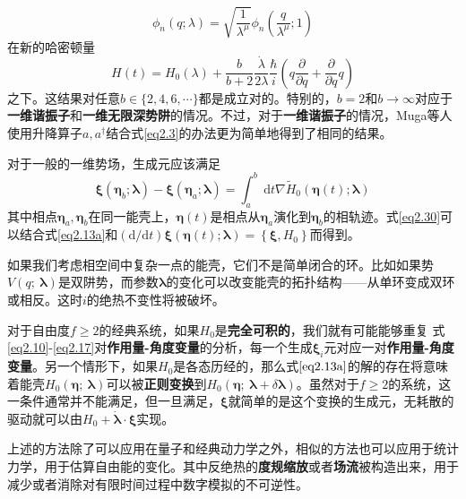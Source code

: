 \begin{equation}
    \phi_{n}(q ; \lambda)=\sqrt{\frac{1}{\lambda^{\mu}}} \phi_{n}\left(\frac{q}{\lambda^{\mu}} ; 1\right)
    \label{eq2.29}
\end{equation}
在新的哈密顿量
\begin{equation}
    H(t)=H_{0}(\lambda)+\frac{b}{b+2} \frac{\dot{\lambda}}{2 \lambda} \frac{\hbar}{i}\left(q \frac{\partial}{\partial q}+\frac{\partial}{\partial q} q\right)
    \label{eq2.29.5}
\end{equation}
之下。这结果对任意$b \in \{ 2, 4, 6, \cdots\}$都是成立对的。特别的，$b=2$和$b \to \infty$对应于\textbf{一维谐振子}和\textbf{一维无限深势阱}的情况。不过，对于\textbf{一维谐振子}的情况，Muga等人使用升降算子$a, a^{\dagger}$结合式\eqref{eq2.3}的办法更为简单地得到了相同的结果。\cite{Muga2010}

对于一般的一维势场，生成元应该满足
\begin{equation}
    \boldsymbol{\xi}\left(\bm{\eta}_{b} ; \boldsymbol{\lambda}\right)-\boldsymbol{\xi}\left(\bm{\eta}_{a} ; \boldsymbol{\lambda}\right)=\int_{a}^{b} \mathrm{~d} t \nabla \tilde{H}_{0}(\bm{\eta}(t) ; \boldsymbol{\lambda})
    \label{eq2.30}
\end{equation}
其中相点$\bm{\eta}_{a}, \bm{\eta}_{b}$在同一能壳上，$\bm{\eta}(t)$是相点从$\bm{\eta}_{a}$演化到$\bm{\eta}_{b}$的相轨迹。式\eqref{eq2.30}可以结合式\eqref{eq2.13a}和$(\mathrm{d} / \mathrm{d} t) \boldsymbol{\xi}(\bm{\eta}(t) ; \boldsymbol{\lambda})=\left\{\boldsymbol{\xi}, H_{0}\right\}$而得到。

如果我们考虑相空间中复杂一点的能壳，它们不是简单闭合的环。比如如果势$V(q;\ \bm{\lambda})$是双阱势，而参数$\bm{\lambda}$的变化可以改变能壳的拓扑结构——从单环变成双环或相反。这时$i$的绝热不变性将被破坏。\cite{Tennyson1986,Cary1986,Hannay1986}

对于自由度$f \geq 2$的经典系统，如果$H_0$是\textbf{完全可积的}\cite{LiuChuan2019}，我们就有可能能够重复
式\eqref{eq2.10}-\eqref{eq2.17}对\textbf{作用量-角度变量}的分析，每一个生成$\bm{\xi}_i$元对应一对\textbf{作用量-角度变量}。另一个情形下，如果$H_0$是各态历经的，那么式$\eqref{eq2.13a}$的解的存在将意味着能壳$H_0 (\bm{\eta};\ \bm{\lambda})$可以被\textbf{正则变换}到$H_0 (\bm{\eta};\ \bm{\lambda}+\delta \bm{\lambda} )$。\cite{Jarzynski1995}虽然对于$f \geq 2$的系统，这一条件通常并不能满足，但一旦满足，$\bm{\xi}$就简单的是这个变换的生成元，无耗散的驱动就可以由$H_0 + \dot{\boldsymbol{\lambda}} \cdot \boldsymbol{\xi}$实现。

上述的方法除了可以应用在量子和经典动力学之外，相似的方法也可以应用于统计力学，用于估算自由能的变化。其中反绝热的\textbf{度规缩放}\cite{Miller2000}或者\textbf{场流}\cite{Vaikuntanathan2008}被构造出来，用于减少或者消除对有限时间过程中数字模拟的不可逆性。

